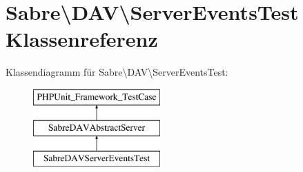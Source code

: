\hypertarget{class_sabre_1_1_d_a_v_1_1_server_events_test}{}\section{Sabre\textbackslash{}D\+AV\textbackslash{}Server\+Events\+Test Klassenreferenz}
\label{class_sabre_1_1_d_a_v_1_1_server_events_test}
Klassendiagramm für Sabre\textbackslash{}D\+AV\textbackslash{}Server\+Events\+Test\+:\begin{figure}[H]
\begin{center}
\leavevmode
\includegraphics[height=3.000000cm]{class_sabre_1_1_d_a_v_1_1_server_events_test}
\end{center}
\end{figure}
